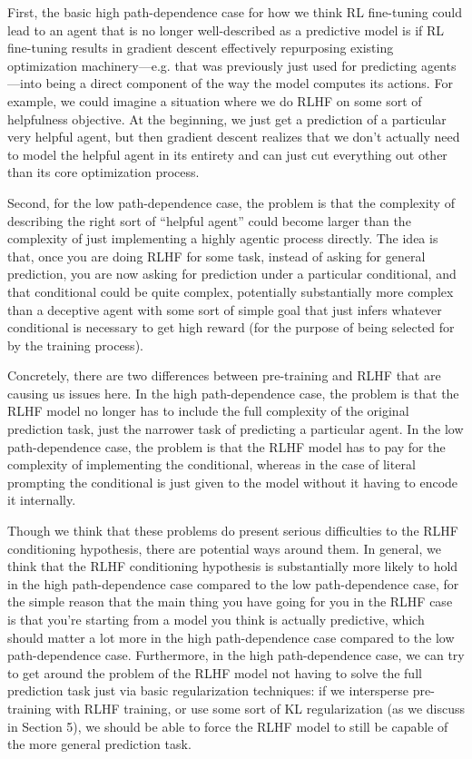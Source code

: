{First, the basic high path-dependence case for how we think RL fine-tuning could lead to an agent that is no longer well-described as a predictive model is if RL fine-tuning results in gradient descent effectively repurposing existing optimization machinery---e.g. that was previously just used for predicting agents---into being a direct component of the way the model computes its actions. For example, we could imagine a situation where we do RLHF on some sort of helpfulness objective\cite{TODO: cite https://arxiv.org/abs/2204.05862}. At the beginning, we just get a prediction of a particular very helpful agent, but then gradient descent realizes that we don't actually need to model the helpful agent in its entirety and can just cut everything out other than its core optimization process.

Second, for the low path-dependence case, the problem is that the complexity of describing the right sort of ``helpful agent'' could become larger than the complexity of just implementing a highly agentic process directly. The idea is that, once you are doing RLHF for some task, instead of asking for general prediction, you are now asking for prediction under a particular conditional, and that conditional could be quite complex, potentially substantially more complex than a deceptive agent with some sort of simple goal that just infers whatever conditional is necessary to get high reward (for the purpose of being selected for by the training process).

Concretely, there are two differences between pre-training and RLHF that are causing us issues here. In the high path-dependence case, the problem is that the RLHF model no longer has to include the full complexity of the original prediction task, just the narrower task of predicting a particular agent. In the low path-dependence case, the problem is that the RLHF model has to pay for the complexity of implementing the conditional, whereas in the case of literal prompting the conditional is just given to the model without it having to encode it internally.

Though we think that these problems do present serious difficulties to the RLHF conditioning hypothesis, there are potential ways around them. In general, we think that the RLHF conditioning hypothesis is substantially more likely to hold in the high path-dependence case compared to the low path-dependence case, for the simple reason that the main thing you have going for you in the RLHF case is that you're starting from a model you think is actually predictive, which should matter a lot more in the high path-dependence case compared to the low path-dependence case. Furthermore, in the high path-dependence case, we can try to get around the problem of the RLHF model not having to solve the full prediction task just via basic regularization techniques: if we intersperse pre-training with RLHF training, or use some sort of KL regularization (as we discuss in Section 5\cite{TODO: cite https://www.alignmentforum.org/posts/3ydumADYt9xkaKRTF/conditioning-predictive-models-interactions-with-other}), we should be able to force the RLHF model to still be capable of the more general prediction task.

}
